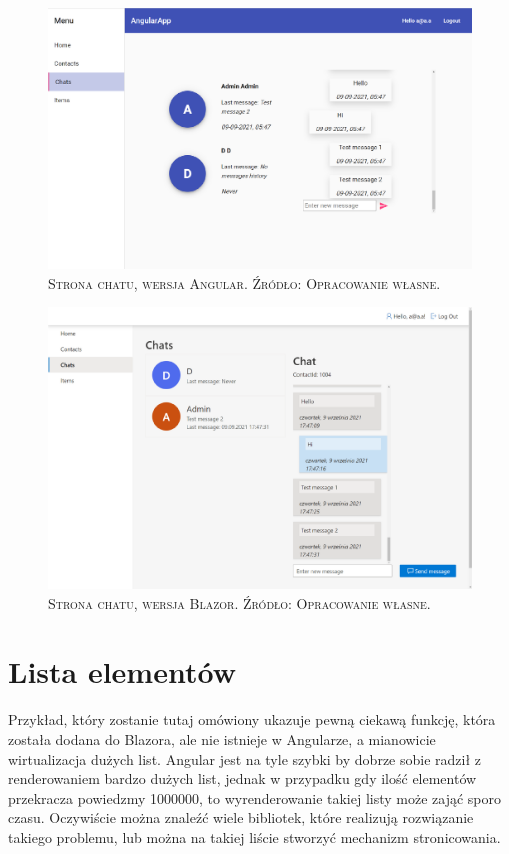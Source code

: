 \documentclass[12pt,a4paper,oneside]{book}
\newcommand{\captionT}[1]{\caption{\textsc{\footnotesize{#1}}}}
\begin{document}
\begin{figure}[H]
\centering
\includegraphics[width=1\textwidth]{images/AngularApp/AngularChat.pdf}
\captionT{Strona chatu, wersja Angular. Źródło: Opracowanie własne.}
\label{rys_app_angular_czat}
\end{figure}

\begin{figure}[H]
\centering
\includegraphics[width=1\textwidth]{images/BlazorApp/BlazorChat.pdf}
\captionT{Strona chatu,  wersja Blazor. Źródło: Opracowanie własne.}
\label{rys_app_blazor_czat}
\end{figure}

\section{Lista elementów}

Przykład, który zostanie tutaj omówiony ukazuje pewną ciekawą funkcję, która została dodana do Blazora, ale nie istnieje w Angularze, a mianowicie wirtualizacja dużych list. Angular jest na tyle szybki by dobrze sobie radził z renderowaniem bardzo dużych list, jednak w przypadku gdy ilość elementów przekracza powiedzmy 1000000, to wyrenderowanie takiej listy może zająć sporo czasu. Oczywiście można znaleźć wiele bibliotek, które realizują rozwiązanie takiego problemu, lub można na takiej liście stworzyć mechanizm stronicowania.
\end{document}
